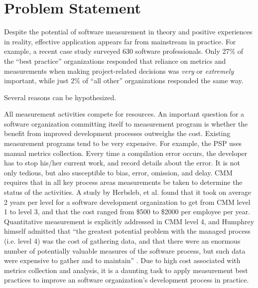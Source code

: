 


\section{Problem Statement}  \label{Intro:Problem}


Despite the potential of software measurement in theory and positive experiences in reality, effective application appears far from mainstream in practice. For example, a recent case study \cite{Kulik:2003} surveyed 630 software professionals. Only 27\% of the ``best practice'' organizations responded that reliance on metrics and measurements when making project-related decisions was \textit{very} or \textit{extremely} important, while just 2\% of ``all other'' organizations responded the same way. 

Several reasons can be hypothesized.

All measurement activities compete for resources. An important question for a software organization committing itself to measurement program is whether the benefit from improved development processes outweighs the cost. Existing measurement programs tend to be very expensive. For example, the PSP uses manual metrics collection. Every time a compilation error occurs, the developer has to stop his/her current work, and record details about the error. It is not only tedious, but also susceptible to bias, error, omission, and delay. CMM requires that in all key process areas measurements be taken to determine the status of the activities. A study by Herbsleb, et al. \cite{Herbsleb:1997} found that it took on average 2 years per level for a software development organization to get from CMM level 1 to level 3, and that the cost ranged from \$500 to \$2000 per employee per year. Quantitative measurement is explicitly addressed in CMM level 4, and Humphrey himself admitted that ``the greatest potential problem with the managed process (i.e. level 4) was the cost of gathering data, and that there were an enormous number of potentially valuable measures of the software process, but such data were expensive to gather and to maintain'' \cite{Humphrey:1988}. Due to high cost associated with metrics collection and analysis, it is a daunting task to apply measurement best practices to improve an software organization's development process in practice. 

